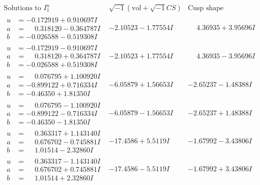 \documentclass[1p]{elsarticle_modified}
\theoremstyle{definition}
\newcommand{\I}{\sqrt{-1}}
\begin{document}
$$\begin{array}{c|c|c}  
\text{Solutions to }I^u_{1}& \I (\text{vol} + \sqrt{-1}CS) & \text{Cusp shape}\\
 \hline 
\begin{aligned}
u &= -0.172919 + 0.910697 I \\
a &= \phantom{-}0.318120 - 0.364787 I \\
b &= -0.026588 - 0.519308 I\end{aligned}
 & -2.10523 - 1.77554 I & \phantom{-}4.36935 + 3.95696 I \\ \hline\begin{aligned}
u &= -0.172919 - 0.910697 I \\
a &= \phantom{-}0.318120 + 0.364787 I \\
b &= -0.026588 + 0.519308 I\end{aligned}
 & -2.10523 + 1.77554 I & \phantom{-}4.36935 - 3.95696 I \\ \hline\begin{aligned}
u &= \phantom{-}0.076795 + 1.100920 I \\
a &= -0.899122 + 0.716334 I \\
b &= -0.46350 + 1.81350 I\end{aligned}
 & -6.05879 + 1.56653 I & -2.65237 - 1.48388 I \\ \hline\begin{aligned}
u &= \phantom{-}0.076795 - 1.100920 I \\
a &= -0.899122 - 0.716334 I \\
b &= -0.46350 - 1.81350 I\end{aligned}
 & -6.05879 - 1.56653 I & -2.65237 + 1.48388 I \\ \hline\begin{aligned}
u &= \phantom{-}0.363317 + 1.143140 I \\
a &= \phantom{-}0.676702 - 0.745881 I \\
b &= \phantom{-}1.01514 - 2.32860 I\end{aligned}
 & -17.4586 + 5.5119 I & -1.67992 - 3.43806 I \\ \hline\begin{aligned}
u &= \phantom{-}0.363317 - 1.143140 I \\
a &= \phantom{-}0.676702 + 0.745881 I \\
b &= \phantom{-}1.01514 + 2.32860 I\end{aligned}
 & -17.4586 - 5.5119 I & -1.67992 + 3.43806 I \\ \hline\begin{aligned}

\end{aligned}
\end{array}$$
\end{document}
